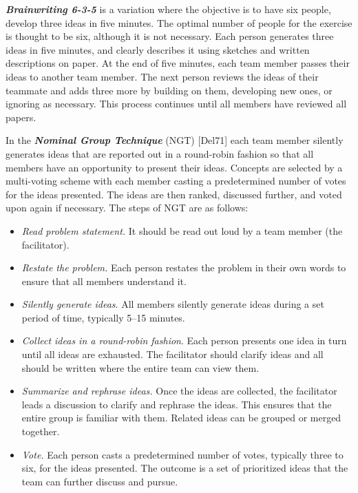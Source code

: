 \emph{\textbf{Brainwriting 6-3-5}} is a variation where the objective is
to have six people, develop three ideas in five minutes. The optimal
number of people for the exercise is thought to be six, although it is
not necessary. Each person generates three ideas in five minutes, and
clearly describes it using sketches and written descriptions on paper.
At the end of five minutes, each team member passes their ideas to
another team member. The next person reviews the ideas of their teammate
and adds three more by building on them, developing new ones, or
ignoring as necessary. This process continues until all members have
reviewed all papers.

In the \emph{\textbf{Nominal Group Technique}} (NGT) {[}Del71{]} each
team member silently generates ideas that are reported out in a
round-robin fashion so that all members have an opportunity to present
their ideas. Concepts are selected by a multi-voting scheme with each
member casting a predetermined number of votes for the ideas presented.
The ideas are then ranked, discussed further, and voted upon again if
necessary. The steps of NGT are as follows:

\begin{itemize}
\item
  \emph{Read problem statement.} It should be read out loud by a team
  member (the facilitator).
\item
  \emph{Restate the problem.} Each person restates the problem in their
  own words to ensure that all members understand it.
\item
  \emph{Silently generate ideas}. All members silently generate ideas
  during a set period of time, typically 5--15 minutes.
\item
  \emph{Collect ideas in a round-robin fashion}. Each person presents
  one idea in turn until all ideas are exhausted. The facilitator should
  clarify ideas and all should be written where the entire team can view
  them.
\item
  \emph{Summarize and rephrase ideas.} Once the ideas are collected, the
  facilitator leads a discus­sion to clarify and rephrase the ideas. This
  ensures that the entire group is familiar with them. Related ideas can
  be grouped or merged together.
\item
  \emph{Vote.} Each person casts a predetermined number of votes,
  typically three to six, for the ideas presented. The outcome is a set
  of prioritized ideas that the team can further discuss and pursue.
\end{itemize}

